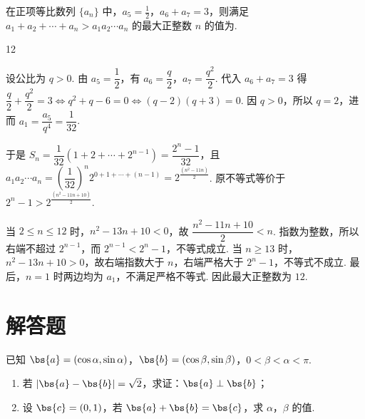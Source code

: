 \begin{problem}
在正项等比数列 \(\{a_n\}\) 中，\(a_5=\frac{1}{2}\)，\(a_6+a_7=3\)，则满足 \(a_1+a_2+\cdots+a_n>a_1a_2\cdots a_n\) 的最大正整数 \(n\) 的值为\fillinblank{}.
\end{problem}

\begin{answer}
12
\end{answer}

\begin{solution}
设公比为 \(q>0\). 由 \(a_5=\dfrac12\)，有 \(a_6=\dfrac q2\)，\(a_7=\dfrac{q^2}2\). 代入 \(a_6+a_7=3\) 得
\(\dfrac q2+\dfrac{q^2}2=3\iff q^2+q-6=0\iff(q-2)(q+3)=0\). 因 \(q>0\)，所以 \(q=2\)，进而 \(a_1=\dfrac{a_5}{q^4}=\dfrac1{32}\).

于是
\(S_n=\dfrac1{32}(1+2+\cdots+2^{n-1})=\dfrac{2^n-1}{32}\)，且
\(a_1a_2\cdots a_n=\left(\dfrac1{32}\right)^n2^{0+1+\cdots+(n-1)}=2^{\frac{(n^2-11n)}{2}}\). 原不等式等价于
\(2^n-1>2^{\frac{(n^2-11n+10)}{2}}\).

当 \(2\leqslant n\leqslant12\) 时，\(n^2-13n+10<0\)，故 \(\dfrac{n^2-11n+10}{2}<n\). 指数为整数，所以右端不超过 \(2^{n-1}\)，而 \(2^{n-1}<2^n-1\)，不等式成立. 当 \(n\geqslant13\) 时，\(n^2-13n+10>0\)，故右端指数大于 \(n\)，右端严格大于 \(2^n-1\)，不等式不成立. 最后，\(n=1\) 时两边均为 \(a_1\)，不满足严格不等式. 因此最大正整数为 \(12\).
\end{solution}

\section{解答题}

\begin{problem}
已知 \(\bs{a}=(\cos\alpha,\sin\alpha)\)，\(\bs{b}=(\cos\beta,\sin\beta)\)，\(0<\beta<\alpha<\pi\).

\begin{enumerate}
\item 若 \(\left|\bs{a}-\bs{b}\right|=\sqrt2\)，求证：\(\bs{a}\perp\bs{b}\)；
\item 设 \(\bs{c}=(0,1)\)，若 \(\bs{a}+\bs{b}=\bs{c}\)，求 \(\alpha\)，\(\beta\) 的值.
\end{enumerate}
\end{problem}

